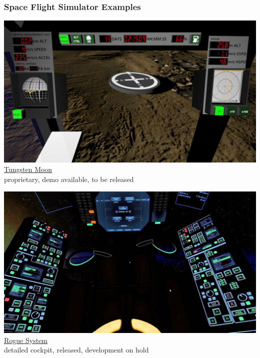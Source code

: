 \documentclass[aspectratio=169,11pt,xcolor=dvipsnames]{beamer}
\begin{document}
\begin{frame}
  \frametitle{Space Flight Simulator Examples}
  \begin{minipage}[t]{0.49\textwidth}
    \begin{center}
      \includegraphics[width=\textwidth]{tungsten-moon}\\
      \href{https://tungstenmoon.com/}{Tungsten Moon}\\
      proprietary, demo available, to be released
    \end{center}
  \end{minipage}
  \begin{minipage}[t]{0.49\textwidth}
    \begin{center}
      \includegraphics[width=\textwidth]{rogue-system}\\
      \href{https://imagespaceinc.com/rogsys/}{Rogue System}\\
      detailed cockpit, released, development on hold
    \end{center}
  \end{minipage}
\end{frame}
\end{document}
